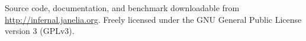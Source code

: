 Source code, documentation, and benchmark downloadable from
\url{http://infernal.janelia.org}. Freely licensed under the GNU
General Public License version 3 (GPLv3).
